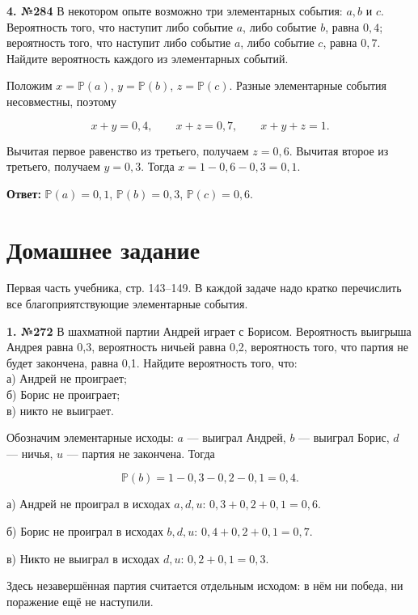 \begin{task}\label{task-problems-4}
\textbf{4. №284} В некотором опыте возможно три элементарных события: $a, b$ и $c$. Вероятность того, что наступит либо событие $a$, либо событие $b$, равна $0,4$; вероятность того, что наступит либо событие $a$, либо событие $c$, равна $0,7$. Найдите вероятность каждого из элементарных событий.
\end{task}

\begin{solution}\label{solution-addition-of-probabilities-problems-4}

Положим $x=\mathbb P(a)$, $y=\mathbb P(b)$, $z=\mathbb P(c)$. Разные элементарные события несовместны, поэтому

\[x+y=0,4,\qquad x+z=0,7,\qquad x+y+z=1.\]

Вычитая первое равенство из третьего, получаем $z=0,6$. Вычитая второе из третьего, получаем $y=0,3$. Тогда $x=1-0,6-0,3=0,1$.

\textbf{Ответ:} $\mathbb P(a)=0,1$, $\mathbb P(b)=0,3$, $\mathbb P(c)=0,6$.
\end{solution}

\section{Домашнее задание}

Первая часть учебника, стр. 143–149. В каждой задаче надо кратко перечислить все благоприятствующие элементарные события.

\begin{task}\label{task-homework-1}
\textbf{1. №272} В шахматной партии Андрей играет с Борисом. Вероятность выигрыша Андрея равна 0,3, вероятность ничьей равна 0,2, вероятность того, что партия не будет закончена, равна 0,1. Найдите вероятность того, что:\\
 а) Андрей не проиграет;\\
 б) Борис не проиграет;\\
 в) никто не выиграет.
\end{task}

\begin{solution}\label{solution-addition-of-probabilities-homework-1}
Обозначим элементарные исходы: $a$ — выиграл Андрей, $b$ — выиграл Борис, $d$ — ничья, $u$ — партия не закончена. Тогда

\[\mathbb P(b)=1-0,3-0,2-0,1=0,4.\]

а) Андрей не проиграл в исходах $a,d,u$: $0,3+0,2+0,1=0,6$.

б) Борис не проиграл в исходах $b,d,u$: $0,4+0,2+0,1=0,7$.

в) Никто не выиграл в исходах $d,u$: $0,2+0,1=0,3$.

Здесь незавершённая партия считается отдельным исходом: в нём ни победа, ни поражение ещё не наступили.
\end{solution}

